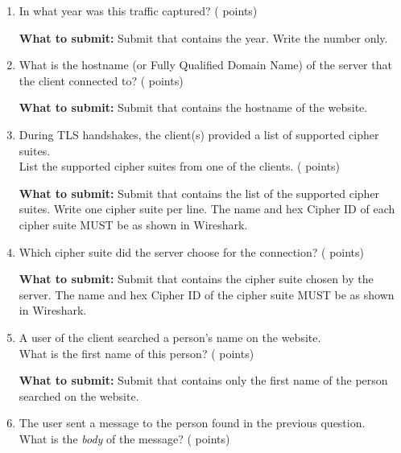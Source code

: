 \begin{enumerate}
  \item \hypertarget{cp1year}{In what year was this traffic captured? ( points)} \label{itm:year}

    \textbf{What to submit:} Submit
      \texttt{\hyperlink{yearformat}{\fileyear}} that contains the year. Write the number only.

  \item \hypertarget{cp1domain}{What is the hostname (or Fully Qualified Domain Name) of the server that the client connected to? ( points)} \label{itm:domain}

    \textbf{What to submit:} Submit
      \texttt{\hyperlink{domainformat}{\filedomain}} that contains the hostname of the website.

  \item \hypertarget{cp1cslist}{During TLS handshakes, the client(s) provided a list of supported cipher suites.\\
  List the supported cipher suites from one of the clients. ( points)} \label{itm:cslist}

    \textbf{What to submit:} Submit
      \texttt{\hyperlink{cslistformat}{\filecslist}} that contains the list of the supported cipher suites.
      Write one cipher suite per line.
      The name and hex Cipher ID of each cipher suite MUST be as shown in Wireshark.

  \item \hypertarget{cp1servercs}{Which cipher suite did the server choose for the connection? ( points)} \label{itm:servercs}

    \textbf{What to submit:} Submit
      \texttt{\hyperlink{servercsformat}{\fileservercs}} that contains the cipher suite chosen by the server.
      The name and hex Cipher ID of the cipher suite MUST be as shown in Wireshark.

  \item \hypertarget{cp1name}{A user of the client searched a person's name on the website.\\
  What is the first name of this person? ( points)} \label{itm:name}

    \textbf{What to submit:} Submit
      \texttt{\hyperlink{nameformat}{\filename}} that contains only the first name of the person searched on the website.

  \item \hypertarget{cp1msg}{The user sent a message to the person found in the previous question.\\
  What is the \textit{body} of the message? ( points)} \label{itm:msg}


\end{enumerate}
